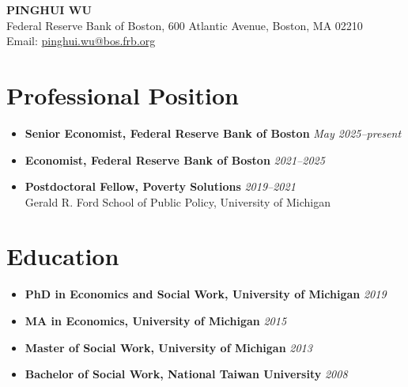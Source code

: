 \documentclass[11pt,letterpaper]{article}
\newcommand{\institution}[2]{\textbf{#1} \hfill \textit{#2}}
\newcommand{\position}[2]{\textbf{#1} \hfill \textit{#2}}
\begin{document}
\begin{center}
    {\LARGE \textbf{PINGHUI WU}}\\[8pt]
    Federal Reserve Bank of Boston, 600 Atlantic Avenue, Boston, MA 02210\\
    Email: \href{mailto:pinghui.wu@bos.frb.org}{pinghui.wu@bos.frb.org}
\end{center}

\section*{Professional Position}
\begin{itemize}[leftmargin=0pt, itemsep=2pt, parsep=0pt]
    \item \position{Senior Economist, Federal Reserve Bank of Boston}{May 2025--present}
    \item \position{Economist, Federal Reserve Bank of Boston}{2021--2025}
    \item \position{Postdoctoral Fellow, Poverty Solutions}{2019--2021}\\
    Gerald R. Ford School of Public Policy, University of Michigan
\end{itemize}

\section*{Education}
\begin{itemize}[leftmargin=0pt, itemsep=2pt, parsep=0pt]
    \item \institution{PhD in Economics and Social Work, University of Michigan}{2019}
    \item \institution{MA in Economics, University of Michigan}{2015}
    \item \institution{Master of Social Work, University of Michigan}{2013}
    \item \institution{Bachelor of Social Work, National Taiwan University}{2008}
\end{itemize}
\end{document}
